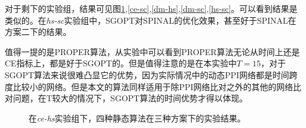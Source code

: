 对于剩下的实验组，结果可见图\ref{ce-hs},\ref{ce-sc},\ref{dm-hs},\ref{dm-sc},\ref{hs-sc}。可以看到结果是类似的。在\textit{hs-sc}实验组中，SGOPT对SPINAL的优化效果，甚至好于SPINAL在方案二下的结果。

值得一提的是PROPER算法，从实验中可以看到PROPER算法无论从时间上还是CE指标上，都是好于SGOPT的。但是值得注意的是在本实验中$T=15$，对于SGOPT算法来说很难凸显它的优势，因为实际情况中的动态PPI网络都是时间跨度比较小的网络。但是本文的算法同样适用于除PPI网络比对之外的其他的网络比对问题，在T较大的情况下，SGOPT算法的时间优势才得以体现。

\begin{figure}[htbp]
    \caption{在\textit{ce-hs}实验组下，四种静态算法在三种方案下的实验结果。}
    \label{ce-hs}
\end{figure}


